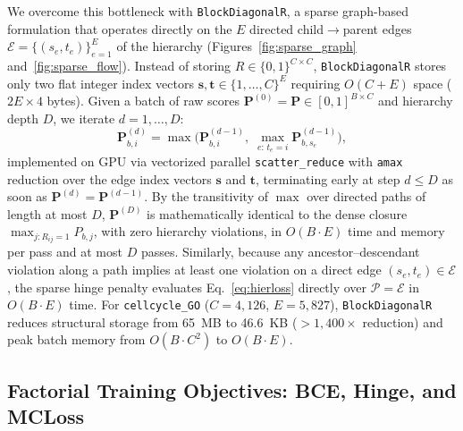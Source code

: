 \documentclass[preprint,12pt]{elsarticle}
\begin{document}
We overcome this bottleneck with \texttt{BlockDiagonalR}, a sparse graph-based
formulation that operates directly on the $E$ directed child$\rightarrow$parent
edges $\mathcal{E} = \{(s_e, t_e)\}_{e=1}^{E}$ of the hierarchy
(Figures~\ref{fig:sparse_graph} and~\ref{fig:sparse_flow}). Instead of storing
$R \in \{0,1\}^{C \times C}$, \texttt{BlockDiagonalR} stores only two flat
integer index vectors $\mathbf{s}, \mathbf{t} \in \{1,\ldots,C\}^E$ requiring
$O(C{+}E)$ space ($2E \times 4$ bytes). Given a batch of raw scores
$\mathbf{P}^{(0)} = \mathbf{P} \in [0,1]^{B \times C}$ and hierarchy depth $D$,
we iterate $d = 1, \ldots, D$:
\begin{equation}
\mathbf{P}^{(d)}_{b, i} = \max\Big(\mathbf{P}^{(d-1)}_{b, i},\;
\max_{e:\, t_e = i} \mathbf{P}^{(d-1)}_{b, s_e}\Big),
\label{eq:sparse_prop}
\end{equation}
implemented on GPU via vectorized parallel \texttt{scatter\_reduce} with
\texttt{amax} reduction over the edge index vectors $\mathbf{s}$ and
$\mathbf{t}$, terminating early at step $d \leq D$ as soon as
$\mathbf{P}^{(d)} = \mathbf{P}^{(d-1)}$. By the transitivity of $\max$ over
directed paths of length at most $D$, $\mathbf{P}^{(D)}$ is mathematically
identical to the dense closure $\max_{j: R_{ij}=1} P_{b,j}$, with zero hierarchy violations, in $O(B \cdot E)$ time and memory per pass
and at most $D$ passes. Similarly,
because any ancestor--descendant violation along a path implies at least one
violation on a direct edge $(s_e, t_e) \in \mathcal{E}$, the sparse hinge
penalty evaluates Eq.~\eqref{eq:hierloss} directly over $\mathcal{P} =
\mathcal{E}$ in $O(B \cdot E)$ time. For \texttt{cellcycle\_GO}
($C{=}4{,}126$, $E{=}5{,}827$), \texttt{BlockDiagonalR} reduces structural
storage from 65~MB to 46.6~KB ($>1{,}400\times$ reduction) and peak batch
memory from $O(B \cdot C^2)$ to $O(B \cdot E)$.

\subsection{Factorial Training Objectives: BCE, Hinge, and MCLoss}
\end{document}

